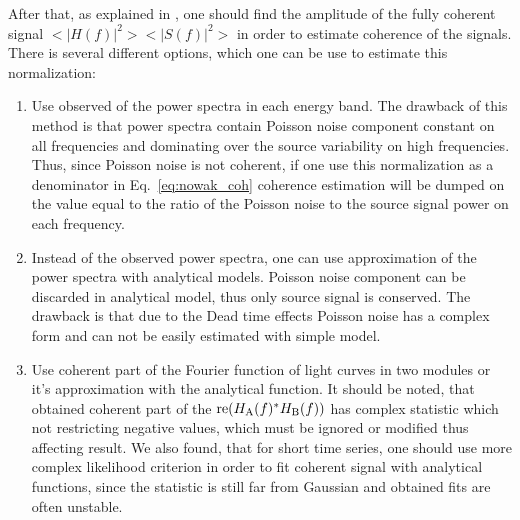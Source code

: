\documentclass[a4paper,fleqn,usenatbib]{mnras}
\begin{document}
\begin{table}
After that, as explained in \citep{nowak99}, one should find the amplitude of the fully coherent signal $<|H(f)|^2><|S(f)|^2>$ in order to estimate coherence of the signals. 
There is several different options, which one can be use to estimate this normalization:
\begin{enumerate}
        \item Use observed of the power spectra in each energy band. 
                 The drawback of this method is that power spectra contain Poisson noise component constant on all frequencies and dominating over the source variability on high frequencies. 
                 Thus, since Poisson noise is not coherent,  if one use this normalization as a denominator in Eq.~\ref{eq:nowak_coh} coherence estimation will be dumped on the value equal to the ratio of the Poisson noise to the source signal power on each frequency.
        \item Instead of the observed power spectra, one can use approximation of the power spectra with analytical models. 
                Poisson noise component can be discarded in analytical model, thus only source signal is conserved. 
                The drawback is that due to the Dead time effects Poisson noise has a complex form and can not be easily estimated with simple model.
        \item Use coherent part of the Fourier function of light curves in two modules \citep{2015ApJ...800..109B} or it's approximation with the analytical function. 
                It should be noted, that obtained coherent part of the ${\rm re}(H_{\rm A}(f)^*H_{\rm B}(f))$ has complex statistic which not restricting negative values, which must be ignored or modified thus affecting result.  
                We also found, that for short time series, one should use more complex likelihood criterion in order to fit coherent signal with analytical functions, since the statistic is still far from Gaussian and obtained fits are often unstable.
\end{enumerate}


\end{table}
\end{document}
